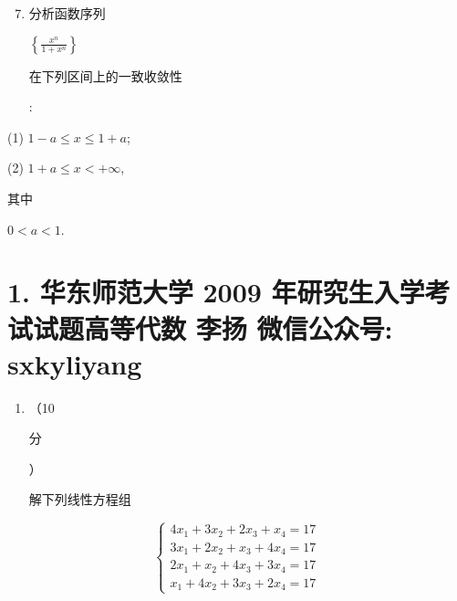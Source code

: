\documentclass[10pt]{article}
\begin{document}
\begin{enumerate}
  \setcounter{enumi}{6}
  \item \begin{CJK}{UTF8}{mj}分析函数序列\end{CJK} $\left\{\frac{x^{n}}{1+x^{n}}\right\}$ \begin{CJK}{UTF8}{mj}在下列区间上的一致收敛性\end{CJK}:
\end{enumerate}
(1) $1-a \leqslant x \leqslant 1+a$;

(2) $1+a \leqslant x<+\infty$, \begin{CJK}{UTF8}{mj}其中\end{CJK} $0<a<1$.

\section{1. 华东师范大学 2009 年研究生入学考试试题高等代数 
 李扬 
 微信公众号: sxkyliyang}
\begin{enumerate}
  \item （10 \begin{CJK}{UTF8}{mj}分\end{CJK}）\begin{CJK}{UTF8}{mj}解下列线性方程组\end{CJK}
\end{enumerate}
$$
\left\{\begin{array}{l}
4 x_{1}+3 x_{2}+2 x_{3}+x_{4}=17 \\
3 x_{1}+2 x_{2}+x_{3}+4 x_{4}=17 \\
2 x_{1}+x_{2}+4 x_{3}+3 x_{4}=17 \\
x_{1}+4 x_{2}+3 x_{3}+2 x_{4}=17
\end{array}\right.
$$
\end{document}
